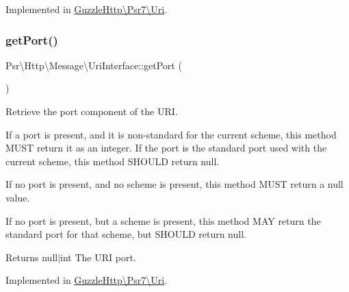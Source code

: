 Implemented in \hyperlink{classGuzzleHttp_1_1Psr7_1_1Uri_a063016fa7af70993d74f3c4efa4e9246}{Guzzle\+Http\textbackslash{}\+Psr7\textbackslash{}\+Uri}.

\mbox{\label{interfacePsr_1_1Http_1_1Message_1_1UriInterface_aa6738a90dce8e99c3b0fc6a73f34cd62}} 
\subsubsection{\texorpdfstring{get\+Port()}{getPort()}}
{\footnotesize\ttfamily Psr\textbackslash{}\+Http\textbackslash{}\+Message\textbackslash{}\+Uri\+Interface\+::get\+Port (\begin{DoxyParamCaption}{ }\end{DoxyParamCaption})}

Retrieve the port component of the U\+RI.

If a port is present, and it is non-\/standard for the current scheme, this method M\+U\+ST return it as an integer. If the port is the standard port used with the current scheme, this method S\+H\+O\+U\+LD return null.

If no port is present, and no scheme is present, this method M\+U\+ST return a null value.

If no port is present, but a scheme is present, this method M\+AY return the standard port for that scheme, but S\+H\+O\+U\+LD return null.

\begin{DoxyReturn}{Returns}
null$\vert$int The U\+RI port. 
\end{DoxyReturn}


Implemented in \hyperlink{classGuzzleHttp_1_1Psr7_1_1Uri_abea314869a6934b7675dd516c72715f9}{Guzzle\+Http\textbackslash{}\+Psr7\textbackslash{}\+Uri}.

\mbox{\label{interfacePsr_1_1Http_1_1Message_1_1UriInterface_a859c8c892d038ba2f1a92b1dfa806ecc}} 
